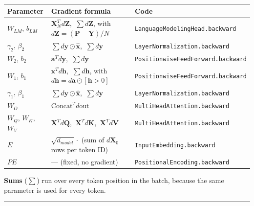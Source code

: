 \documentclass[11pt,a4paper,oneside]{report}
\begin{document}
{\def\LTcaptype{none} %
\begin{longtable}[]{@{}>{\raggedright\arraybackslash}p{}>{\raggedright\arraybackslash}p{}>{\raggedright\arraybackslash}p{}@{}}
\toprule\noalign{}
Parameter & Gradient formula & Code \\
\midrule\noalign{}
\endhead
\bottomrule\noalign{}
\endlastfoot
\(W_{LM}\), \(b_{LM}\) & \(\mathbf{X}_N^T d\mathbf{Z}\), \(\ \sum d\mathbf{Z}\), with \(d\mathbf{Z} = (\mathbf{P} - \mathbf{Y}) / N\) & \texttt{LanguageModelingHead.\allowbreak{}backward} \\
\(\gamma_2\), \(\beta_2\) & \(\sum d\mathbf{y} \odot \hat{\mathbf{x}}\), \(\ \sum d\mathbf{y}\) & \texttt{LayerNormalization.\allowbreak{}backward} \\
\(W_2\), \(b_2\) & \(\mathbf{a}^T d\mathbf{y}\), \(\ \sum d\mathbf{y}\) & \texttt{PositionwiseFeedForward.\allowbreak{}backward} \\
\(W_1\), \(b_1\) & \(\mathbf{x}^T d\mathbf{h}\), \(\ \sum d\mathbf{h}\), with \(d\mathbf{h} = d\mathbf{a} \odot [\mathbf{h} > 0]\) & \texttt{PositionwiseFeedForward.\allowbreak{}backward} \\
\(\gamma_1\), \(\beta_1\) & \(\sum d\mathbf{y} \odot \hat{\mathbf{x}}\), \(\ \sum d\mathbf{y}\) & \texttt{LayerNormalization.\allowbreak{}backward} \\
\(W_O\) & \(\text{Concat}^T d\text{out}\) & \texttt{MultiHeadAttention.\allowbreak{}backward} \\
\(W_Q\), \(W_K\), \(W_V\) & \(\mathbf{X}^T d\mathbf{Q}\), \(\ \mathbf{X}^T d\mathbf{K}\), \(\ \mathbf{X}^T d\mathbf{V}\) & \texttt{MultiHeadAttention.\allowbreak{}backward} \\
\(E\) & \(\sqrt{d_{model}} \cdot\) (sum of \(d\mathbf{X}_0\) rows per token ID) & \texttt{InputEmbedding.\allowbreak{}backward} \\
\(PE\) & --- (fixed, no gradient) & \texttt{PositionalEncoding.\allowbreak{}backward} \\
\end{longtable}
}

\textbf{Sums} (\(\sum\)) run over every token position in the batch, because the same parameter is used for every token.

\begin{center}\rule{0.5\linewidth}{0.5pt}\end{center}
\end{document}
